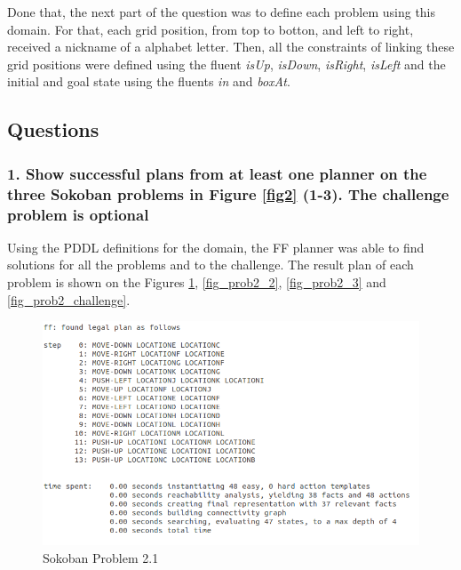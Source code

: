 \documentclass[10pt, letter]{article}
\begin{document}
Done that, the next part of the question was to define each problem using this domain. For that, each grid position, from top to botton, and left to right, received a nickname of a alphabet letter. Then, all the constraints of linking these grid positions were defined using the fluent \textit{isUp}, \textit{isDown}, \textit{isRight}, \textit{isLeft} and the initial and goal state using the fluents \textit{in} and \textit{boxAt}.

\subsection{Questions}
\subsubsection*{1. Show successful plans from at least one planner on the three Sokoban problems in Figure \ref{fig2} (1-3). The challenge problem is optional}
Using the PDDL definitions for the domain, the FF planner was able to find solutions for all the problems and to the challenge. The result plan of each problem is shown on the Figures \ref{fig_prob2_1}, \ref{fig_prob2_2}, \ref{fig_prob2_3} and \ref{fig_prob2_challenge}.

\begin{figure}[h!]
  \centering
    \includegraphics[scale = 0.4]{images/FF_Solution_p2_1}
    \caption{Sokoban Problem 2.1}
  \label{fig_prob2_1}
\end{figure}
\end{document}
